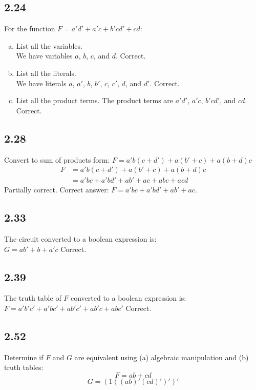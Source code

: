 \documentclass{article}
\begin{document}
\subsection*{2.24}
For the function $F = a'd' + a'c + b'cd' + cd$:
\begin{enumerate}[(a)]
    \item List all the variables. \\
    We have variables $a$, $b$, $c$, and $d$. \textcolor{mygreen}{Correct.}
    \item List all the literals. \\
    We have literals $a$, $a'$, $b$, $b'$, $c$, $c'$, $d$, and $d'$. \textcolor{mygreen}{Correct.}
    \item List all the product terms.
    The product terms are $a'd'$, $a'c$, $b'cd'$, and $cd$. \textcolor{mygreen}{Correct.}
\end{enumerate}

\subsection*{2.28}
Convert to sum of products form: $F = a'b(c + d') + a(b' + c) + a(b + d)c$
\begin{align*}
    F &= a'b(c + d') + a(b' + c) + a(b + d)c \\
    &= a'bc + a'bd' + ab' + ac + abc + acd
\end{align*}
\textcolor{myorange}{Partially correct. Correct answer: $F = a'bc + a'bd' + ab' + ac$.}

\subsection*{2.33}
The circuit converted to a boolean expression is: \\
$ G = ab' + b + a'c $
\textcolor{mygreen}{Correct.}

\subsection*{2.39}
The truth table of $F$ converted to a boolean expression is: \\
$ F = a'b'c' + a'bc' + ab'c' + ab'c + abc' $
\textcolor{mygreen}{Correct.}

\newpage
\subsection*{2.52}
Determine if $F$ and $G$ are equivalent using (a) algebraic manipulation and (b) truth tables: \\
$$ F = ab + cd $$
$$ G = (1((ab)'(cd)')')' $$
\end{document}
